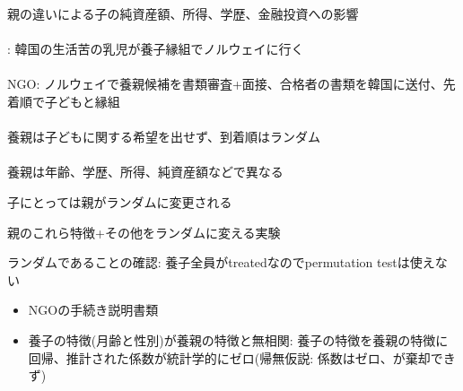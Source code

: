 \begin{frame}[t]{}
親の違いによる子の純資産額、所得、学歴、金融投資への影響\\~\\

\citet{FagerengMogstadRonning2021}: 韓国の生活苦の乳児が養子縁組でノルウェイに行く\\~\\

\pause
NGO: ノルウェイで養親候補を書類審査+面接、合格者の書類を韓国に送付、先着順で子どもと縁組\\~\\

\pause
養親は子どもに関する希望を出せず、到着順はランダム\\~\\
\pause
養親は年齢、学歴、所得、純資産額などで異なる
\begin{dinglist}{43}
\vspace{1.0ex}\setlength{\itemsep}{1.0ex}\setlength{\baselineskip}{12pt}
\pause
\item	子にとっては親がランダムに変更される
\pause
\item	親のこれら特徴+その他をランダムに変える実験
\end{dinglist}

\vspace{2ex}
\pause
ランダムであることの確認: 
\pause
養子全員がtreatedなのでpermutation testは使えない
\begin{itemize}
\vspace{1.0ex}\setlength{\itemsep}{1.0ex}\setlength{\baselineskip}{12pt}
\pause
\item	NGOの手続き説明書類
\pause
\item	養子の特徴(月齢と性別)が養親の特徴と無相関: 養子の特徴を養親の特徴に回帰、推計された係数が統計学的にゼロ(帰無仮説: 係数はゼロ、が棄却できず)
\end{itemize}
\end{frame}


